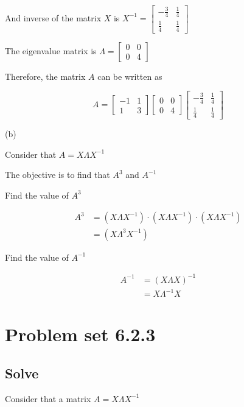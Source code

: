 \documentclass{article}
\begin{document}
And inverse of the matrix $X$ is $X^{-1}=\left[\begin{array}{cc}-\frac{3}{4} & \frac{1}{4} \\ \frac{1}{4} & \frac{1}{4}\end{array}\right]$

The eigenvalue matrix is $\Lambda=\left[\begin{array}{ll}0 & 0 \\ 0 & 4\end{array}\right]$

Therefore, the matrix $A$ can be written as

$$
A=\left[\begin{array}{cc}
-1 & 1 \\
1 & 3
\end{array}\right]\left[\begin{array}{ll}
0 & 0 \\
0 & 4
\end{array}\right]\left[\begin{array}{cc}
-\frac{3}{4} & \frac{1}{4} \\
\frac{1}{4} & \frac{1}{4}
\end{array}\right]
$$

(b)

Consider that $A=X \Lambda X^{-1}$

The objective is to find that $A^{3}$ and $A^{-1}$

Find the value of $A^{3}$

$$
\begin{aligned}
A^{3} & =\left(X \Lambda X^{-1}\right) \cdot\left(X \Lambda X^{-1}\right) \cdot\left(X \Lambda X^{-1}\right) \\
& =\left(X \Lambda^{3} X^{-1}\right)
\end{aligned}
$$

Find the value of $A^{-1}$

$$
\begin{aligned}
A^{-1} & =(X \Lambda X)^{-1} \\
& =X \Lambda^{-1} X
\end{aligned}
$$
%
\section*{Problem set 6.2.3}
\subsection{Solve}
Consider that a matrix $A=X \Lambda X^{-1}$
\end{document}

